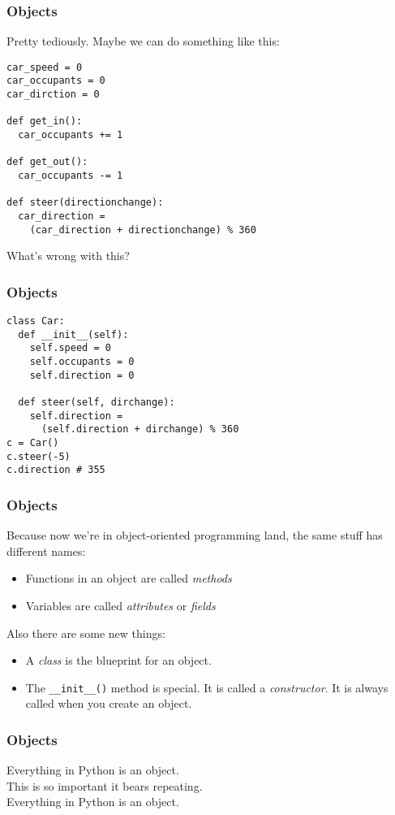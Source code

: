 \documentclass{beamer}
\begin{document}
\begin{frame}[fragile]
  \frametitle{Objects}
  Pretty tediously. Maybe we can do something like this:
    \begin{lstlisting}
car_speed = 0
car_occupants = 0
car_dirction = 0

def get_in():
  car_occupants += 1

def get_out():
  car_occupants -= 1

def steer(directionchange):
  car_direction =
    (car_direction + directionchange) % 360

    \end{lstlisting}
  What's wrong with this?
\end{frame}

\begin{frame}[fragile]
  \frametitle{Objects}
  \begin{lstlisting}
class Car:
  def __init__(self):
    self.speed = 0
    self.occupants = 0
    self.direction = 0

  def steer(self, dirchange):
    self.direction =
      (self.direction + dirchange) % 360
c = Car()
c.steer(-5)
c.direction # 355
  \end{lstlisting}
\end{frame}

\begin{frame}
  \frametitle{Objects}
  Because now we're in object-oriented programming land, the same stuff has different names:
  \begin{itemize}
    \item Functions in an object are called \emph{methods}
    \item Variables are called \emph{attributes} or \emph{fields} 
  \end{itemize}
  Also there are some new things:
  \begin{itemize}
    \item A \emph{class} is the blueprint for an object.
    \item The \lstinline{__init__()} method is special. It is called a \emph{constructor}. It is always called when you create an object.
  \end{itemize}
\end{frame}

\begin{frame}
  \frametitle{Objects}
  Everything in Python is an object. \\
  This is so important it bears repeating. \\
  Everything in Python is an object.\\
\end{frame}
\end{document}
